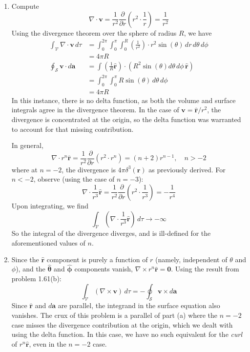 \documentclass[a4paper]{article}
\begin{document}
\begin{enumerate}[label=(\alph*)]
	\item Compute
	\[
		\nabla \cdot \pmb{v} = \frac{1}{r^{2}}\frac{\partial }{\partial r}\!\left( r^{2} \cdot \frac{1}{r} \right) = \frac{1}{r^{2}} 
	\]
	Using the divergence theorem over the sphere of radius \( R \), we have
	\begin{align*}
		\int_{\mathcal{V}}\nabla \cdot \pmb{v} \, d \tau & = \int^{2 \pi}_{0} \int^{\pi}_{0} \int^{R}_{0} \!\left( \frac{1}{r^{2}} \right) \cdot r^{2}\sin\!\left(\theta\right) \, dr \, d \theta \, d \phi \\
								 & = 4 \pi R \\
		\oint_{\mathcal{S}}\pmb{v} \cdot d \pmb{a} & = \int \!\left( \frac{1}{R}\pmb{\hat{r}} \right) \cdot \!\left( R^{2}\sin\!\left(\theta\right) d \theta \, d \phi \, \pmb{\hat{r}} \right) \\
							   & = \int^{2 \pi}_{0} \int^{\pi}_{0} R \sin\!\left(\theta\right) \, d \theta \, d \phi \\
							   & = 4 \pi R
	\end{align*}
	In this instance, there is no delta function, as both the volume and surface integrals agree in the divergence theorem. In the case of \( \pmb{v} = \pmb{\hat{r}} / r^{2} \), the divergence is concentrated at the origin, so the delta function was warranted to account for that missing contribution.

	In general,
	\[
		\nabla \cdot r^{n}\pmb{\hat{r}} = \frac{1}{r^{2}}\frac{\partial }{\partial r}\!\left( r^{2} \cdot r^{n} \right) = \!\left( n + 2 \right)r^{n - 1}, \quad n > -2 
	\]
	where at \( n = -2 \), the divergence is \( 4 \pi \delta^{3}\!\left( \pmb{r} \right) \) as previously derived. For \( n < -2 \), observe (using the case of \( n = -3 \)):
	\[
		\nabla \cdot \frac{1}{r^{3}}\pmb{\hat{r}} = \frac{1}{r^{2}}\frac{\partial }{\partial r}\!\left( r^{2} \cdot \frac{1}{r^{3}} \right) = -\frac{1}{r^{4}}
	\]
	Upon integrating, we find
	\[
		\int_{\mathcal{V}}\!\left( \nabla \cdot \frac{1}{r^{3}}\pmb{\hat{r}} \right) \, d \tau \rightarrow -\infty 
	\]
	So the integral of the divergence diverges, and is ill-defined for the aforementioned values of \( n \).
	\item Since the \( \pmb{\hat{r}} \) component is purely a function of \( r \) (namely, independent of \( \theta \) and \( \phi \)), and the \( \pmb{\hat{\theta}} \) and \( \pmb{\hat{\phi}} \) components vanish, \( \nabla \times r^{n}\pmb{\hat{r}} = \pmb{0} \). Using the result from problem 1.61(b):
	\[
		\int_{\mathcal{V}}\!\left( \nabla \times \pmb{v} \right) \, d \tau = -\oint_{\mathcal{S}} \pmb{v} \times d \pmb{a} 
	\]
	Since \( \pmb{\hat{r}} \) and \( d \pmb{a} \) are parallel, the integrand in the surface equation also vanishes. The crux of this problem is a parallel of part (a) where the \( n = -2 \) case misses the divergence contribution at the origin, which we dealt with using the delta function. In this case, we have no such equivalent for the \textit{curl} of \( r^{n}\pmb{\hat{r}} \), even in the \( n = -2 \) case. 
\end{enumerate}
\end{document}
